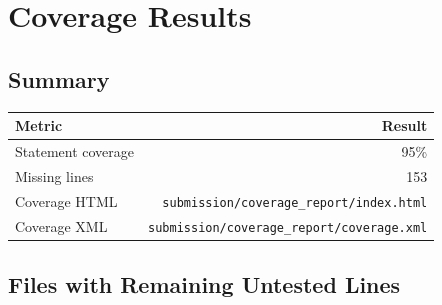 \documentclass[11pt]{article}
\newcommand{\code}[1]{\texttt{#1}}
\begin{document}
\section{Coverage Results}

\subsection{Summary}

\begin{center}
\begin{tabular}{lr}
\toprule
\textbf{Metric} & \textbf{Result} \\
\midrule
Statement coverage         & 95\% \\
Missing lines              & 153 \\
Coverage HTML              & \code{submission/coverage\_report/index.html} \\
Coverage XML               & \code{submission/coverage\_report/coverage.xml} \\
\bottomrule
\end{tabular}
\end{center}

\subsection{Files with Remaining Untested Lines}
\end{document}
